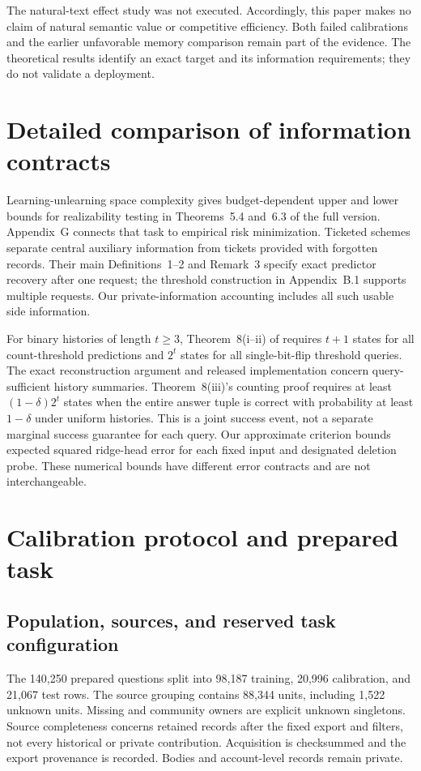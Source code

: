The natural-text effect study was not executed. Accordingly, this paper
makes no claim of natural semantic value or competitive efficiency. Both
failed calibrations and the earlier unfavorable memory comparison remain
part of the evidence. The theoretical results identify an exact target and
its information requirements; they do not validate a deployment.



\section{Detailed comparison of information contracts}\label{app:comparison}
Learning-unlearning space complexity \citep{space} gives budget-dependent
upper and lower bounds for realizability testing in Theorems~5.4 and~6.3
of the full version. Appendix~G connects that task to empirical risk
minimization. Ticketed schemes \citep{ticketed} separate central auxiliary
information from tickets provided with forgotten records. Their main
Definitions~1--2 and Remark~3 specify exact predictor recovery after one
request; the threshold construction in Appendix~B.1 supports multiple
requests. Our private-information accounting includes all such usable
side information.

For binary histories of length $t\ge3$, Theorem~8(i--ii) of
\citet{counterfactual} requires $t+1$ states for all count-threshold
predictions and $2^t$ states for all single-bit-flip threshold queries.
The exact reconstruction argument and released implementation
\citep{counterfactualcode} concern query-sufficient history summaries.
Theorem~8(iii)'s counting proof requires at least $(1-\delta)2^t$ states
when the entire answer tuple is correct with probability at least
$1-\delta$ under uniform histories. This is a joint success event, not a
separate marginal success guarantee for each query. Our approximate
criterion bounds expected squared ridge-head error for each fixed input
and designated deletion probe. These numerical bounds have different
error contracts and are not interchangeable.


\section{Calibration protocol and prepared task}\label{app:protocol}
\subsection{Population, sources, and reserved task configuration}
The 140,250 prepared questions split into 98,187 training, 20,996
calibration, and 21,067 test rows. The source grouping contains 88,344
units, including 1,522 unknown units. Missing and community owners are
explicit unknown singletons. Source completeness concerns retained records
after the fixed export and filters, not every historical or private
contribution. Acquisition is checksummed and the export provenance is
recorded. Bodies and account-level records remain private.

